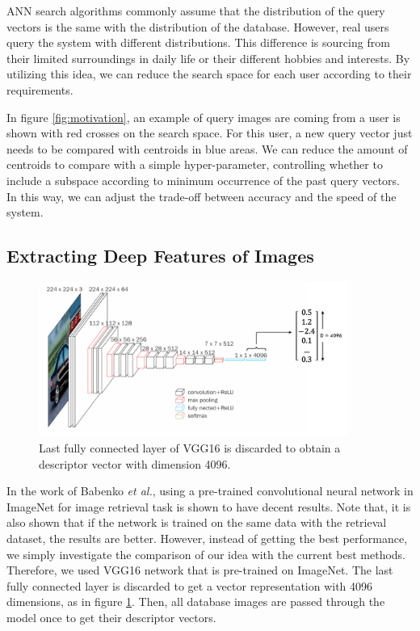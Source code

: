 ANN search algorithms commonly assume that the distribution of the query vectors is the same with the distribution of the database. 
However, real users query the system with different distributions.
This difference is sourcing from their limited surroundings in daily life or their different hobbies and interests. 
By utilizing this idea, we can reduce the search space for each user according to their requirements.

In figure \ref{fig:motivation}, an example of query images are coming from a user is shown with red crosses on the search space. 
For this user, a new query vector just needs to be compared with centroids in blue areas. 
We can reduce the amount of centroids to compare with a simple hyper-parameter, controlling whether to include a subspace according to minimum occurrence of the past query vectors. 
In this way, we can adjust the trade-off between accuracy and the speed of the system.


\subsection{Extracting Deep Features of Images}
\label{extractdeepfeatures}

\begin{figure}
    \centering
    \includegraphics[width=0.9\textwidth]{thesis/images/deep_features-fig.png}
    \caption{Last fully connected layer of VGG16\cite{simonyan2014very} is discarded to obtain a descriptor vector with dimension 4096.}
    \label{fig:vec-repr}
\end{figure}

In the work of Babenko \emph{et al.}\cite{babenko2014neural}, using a pre-trained convolutional neural network in ImageNet for image retrieval task is shown to have decent results. 
Note that, it is also shown that if the network is trained on the same data with the retrieval dataset, the results are better.
However, instead of getting the best performance, we simply investigate the comparison of our idea with the current best methods.
Therefore, we used VGG16\cite{simonyan2014very} network that is pre-trained on ImageNet\cite{deng2009imagenet}. 
The last fully connected layer is discarded to get a vector representation with 4096 dimensions, as in figure \ref{fig:vec-repr}.
Then, all database images are passed through the model once to get their descriptor vectors.

